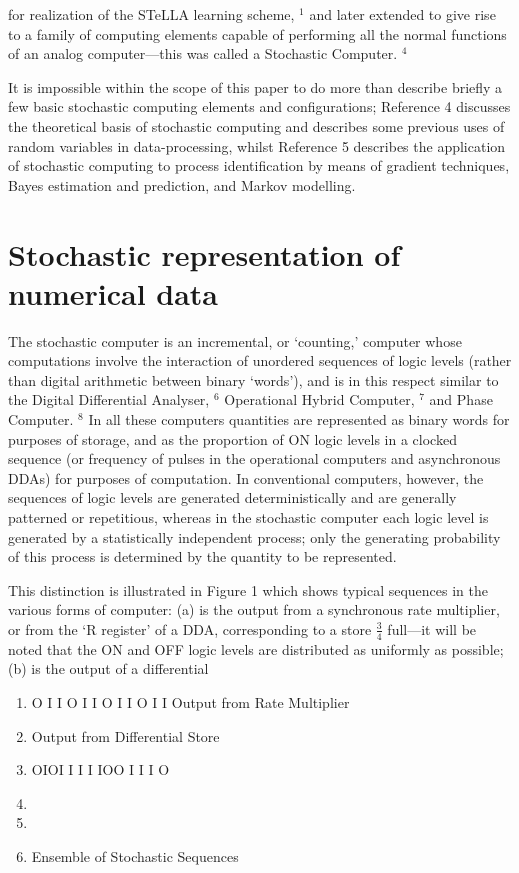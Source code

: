 \documentclass[
  10
]{article}
\providecommand{\tightlist}{%
  \setlength{\itemsep}{0pt}\setlength{\parskip}{0pt}}
\begin{document}
for realization of the STeLLA learning scheme, \(^{1}\) and later
extended to give rise to a family of computing elements capable of
performing all the normal functions of an analog computer---this was
called a Stochastic Computer. \(^{4}\)

It is impossible within the scope of this paper to do more than describe
briefly a few basic stochastic computing elements and configurations;
Reference 4 discusses the theoretical basis of stochastic computing and
describes some previous uses of random variables in data-processing,
whilst Reference 5 describes the application of stochastic computing to
process identification by means of gradient techniques, Bayes estimation
and prediction, and Markov modelling.

\section{Stochastic representation of numerical
data}\label{stochastic-representation-of-numerical-data}

The stochastic computer is an incremental, or `counting,' computer whose
computations involve the interaction of unordered sequences of logic
levels (rather than digital arithmetic between binary `words'), and is
in this respect similar to the Digital Differential Analyser, \(^{6}\)
Operational Hybrid Computer, \(^{7}\) and Phase Computer. \(^{8}\) In
all these computers quantities are represented as binary words for
purposes of storage, and as the proportion of ON logic levels in a
clocked sequence (or frequency of pulses in the operational computers
and asynchronous DDAs) for purposes of computation. In conventional
computers, however, the sequences of logic levels are generated
deterministically and are generally patterned or repetitious, whereas in
the stochastic computer each logic level is generated by a statistically
independent process; only the generating probability of this process is
determined by the quantity to be represented.

This distinction is illustrated in Figure 1 which shows typical
sequences in the various forms of computer: (a) is the output from a
synchronous rate multiplier, or from the `R register' of a DDA,
corresponding to a store \(\frac{3}{4}\) full---it will be noted that
the ON and OFF logic levels are distributed as uniformly as possible;
(b) is the output of a differential

\begin{enumerate}
\def\labelenumi{(\alph{enumi})}
\tightlist
\item
  O I I O I I O I I O I I Output from Rate Multiplier\\
\item
  Output from Differential Store\\
\item
  OIOI I I I IOO I I I O\\
\item
\item
\item
  Ensemble of Stochastic Sequences
\end{enumerate}
\end{document}
